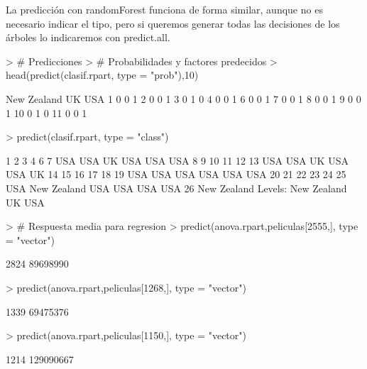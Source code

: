 \documentclass[a4paper]{article}
\begin{document}
La predicción con randomForest funciona de forma similar, aunque no es necesario indicar el tipo, pero si queremos generar todas las decisiones de los árboles lo indicaremos con predict.all.
\begin{Schunk}
\begin{Sinput}
> # Predicciones
> # Probabilidades y factores predecidos
> head(predict(clasif.rpart, type = "prob"),10)
\end{Sinput}
\begin{Soutput}
   New Zealand UK USA
1            0  0   1
2            0  0   1
3            0  1   0
4            0  0   1
6            0  0   1
7            0  0   1
8            0  0   1
9            0  0   1
10           0  1   0
11           0  0   1
\end{Soutput}
\begin{Sinput}
> predict(clasif.rpart, type = "class")
\end{Sinput}
\begin{Soutput}
          1           2           3           4           6           7 
        USA         USA          UK         USA         USA         USA 
          8           9          10          11          12          13 
        USA         USA          UK         USA         USA          UK 
         14          15          16          17          18          19 
        USA         USA         USA         USA         USA         USA 
         20          21          22          23          24          25 
        USA New Zealand         USA         USA         USA         USA 
         26 
New Zealand 
Levels: New Zealand UK USA
\end{Soutput}
\begin{Sinput}
> # Respuesta media para regresion
> predict(anova.rpart,peliculas[2555,], type = "vector")
\end{Sinput}
\begin{Soutput}
    2824 
89698990 
\end{Soutput}
\begin{Sinput}
> predict(anova.rpart,peliculas[1268,], type = "vector")
\end{Sinput}
\begin{Soutput}
    1339 
69475376 
\end{Soutput}
\begin{Sinput}
> predict(anova.rpart,peliculas[1150,], type = "vector")
\end{Sinput}
\begin{Soutput}
     1214 
129090667 
\end{Soutput}

\end{Schunk}
\end{document}

